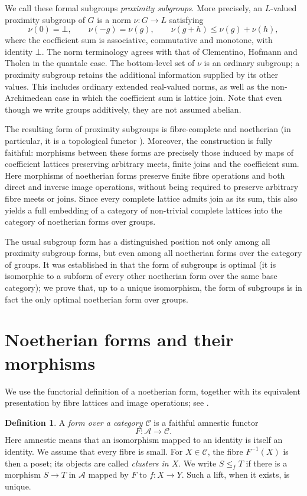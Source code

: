 \documentclass[12pt,a4paper]{amsart}
\theoremstyle{definition}
\newtheorem{definition}[theorem]{Definition}
\newcommand{\C}{\mathcal C}
\newcommand{\A}{\mathcal A}
\begin{document}
We call these formal subgroups \emph{proximity subgroups}. More precisely, an $L$-valued proximity subgroup of $G$ is a norm $\nu:G\to L$ satisfying
\[
 \nu(0)=\bot,\qquad \nu(-g)=\nu(g),\qquad
 \nu(g+h)\leq\nu(g)+\nu(h),
\]
where the coefficient sum is associative, commutative and monotone, with identity $\bot$. The norm terminology agrees with that of Clementino, Hofmann and Tholen \cite{CHT} in the quantale case. The bottom-level set of $\nu$ is an ordinary subgroup; a proximity subgroup retains the additional information supplied by its other values. This includes ordinary extended real-valued norms, as well as the non-Archimedean case in which the coefficient sum is lattice join. Note that even though we write groups additively, they are not assumed abelian.

The resulting form of proximity subgroups is fibre-complete and noetherian (in particular, it is a topological functor \cite{Brummer}). Moreover, the construction is fully faithful: morphisms between these forms are precisely those induced by maps of coefficient lattices preserving arbitrary meets, finite joins and the coefficient sum. Here morphisms of noetherian forms preserve finite fibre operations and both direct and inverse image operations, without being required to preserve arbitrary fibre meets or joins. Since every complete lattice admits join as its sum, this also yields a full embedding of a category of non-trivial complete lattices into the category of noetherian forms over groups.

The usual subgroup form has a distinguished position not only among all proximity subgroup forms, but even among all noetherian forms over the category of groups. It was established in \cite{JV} that the form of subgroups is optimal (it is isomorphic to a subform of every other noetherian form over the same base category); we prove that, up to a unique isomorphism, the form of subgroups is in fact the only optimal noetherian form over groups.

\tableofcontents

\section{Noetherian forms and their morphisms}\label{sec:forms}
We use the functorial definition of a noetherian form, together with its equivalent presentation by fibre lattices and image operations; see \cite{GJ,JV}.

\begin{definition}\label{def:form}
A \emph{form over a category $\C$} is a faithful amnestic functor
\[
                       F:\A\longrightarrow\C.
\]
Here amnestic means that an isomorphism mapped to an identity is itself an identity. We assume that every fibre is small. For $X\in\C$, the fibre $F^{-1}(X)$ is then a poset; its objects are called \emph{clusters in $X$}. We write $S\leq_f T$ if there is a morphism $S\to T$ in $\A$ mapped by $F$ to $f:X\to Y$. Such a lift, when it exists, is unique.
\end{definition}
\end{document}
